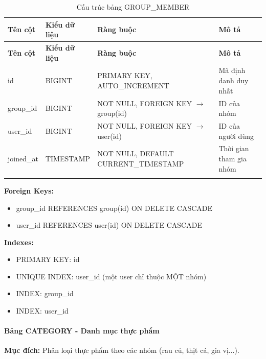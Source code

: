 \small
\begin{longtable}{|>{\raggedright\arraybackslash}p{3.5cm}|>{\raggedright\arraybackslash}p{3cm}|>{\raggedright\arraybackslash}p{4cm}|>{\raggedright\arraybackslash}p{4cm}|}
\hline
\textbf{Tên cột} & \textbf{Kiểu dữ liệu} & \textbf{Ràng buộc} & \textbf{Mô tả} \\
\hline
\endfirsthead
\hline
\textbf{Tên cột} & \textbf{Kiểu dữ liệu} & \textbf{Ràng buộc} & \textbf{Mô tả} \\
\hline
\endhead
id & BIGINT & PRIMARY KEY, AUTO\_INCREMENT & Mã định danh duy nhất \\
\hline
group\_id & BIGINT & NOT NULL, FOREIGN KEY $\rightarrow$ group(id) & ID của nhóm \\
\hline
user\_id & BIGINT & NOT NULL, FOREIGN KEY $\rightarrow$ user(id) & ID của người dùng \\
\hline
joined\_at & TIMESTAMP & NOT NULL, DEFAULT CURRENT\_TIMESTAMP & Thời gian tham gia nhóm \\
\hline
\caption{Cấu trúc bảng GROUP\_MEMBER}
\end{longtable}

\textbf{Foreign Keys:}
\begin{itemize}
    \item group\_id REFERENCES group(id) ON DELETE CASCADE
    \item user\_id REFERENCES user(id) ON DELETE CASCADE
\end{itemize}

\textbf{Indexes:}
\begin{itemize}
    \item PRIMARY KEY: id
    \item UNIQUE INDEX: user\_id (một user chỉ thuộc MỘT nhóm)
    \item INDEX: group\_id
    \item INDEX: user\_id
\end{itemize}

\paragraph{Bảng CATEGORY - Danh mục thực phẩm}
\textbf{Mục đích:} Phân loại thực phẩm theo các nhóm (rau củ, thịt cá, gia vị...).

